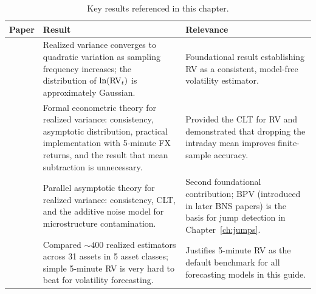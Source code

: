 
\begin{table}[htbp]
\centering
\caption{Key results referenced in this chapter.}
\label{tab:ch02-key-results}
\begin{tabular}{@{} p{4.5cm} p{6cm} p{4cm} @{}}
\toprule
\textbf{Paper} & \textbf{Result} & \textbf{Relevance} \\
\midrule
\citet{ABDL2001} &
Realized variance converges to quadratic variation as sampling frequency increases; the distribution of $\ln(\operatorname{RV}_t)$ is approximately Gaussian. &
Foundational result establishing RV as a consistent, model-free volatility estimator. \\[6pt]

\citet{ABDL2003} &
Formal econometric theory for realized variance: consistency, asymptotic distribution, practical implementation with 5-minute FX returns, and the result that mean subtraction is unnecessary. &
Provided the CLT for RV and demonstrated that dropping the intraday mean improves finite-sample accuracy. \\[6pt]

\citet{BNS2002} &
Parallel asymptotic theory for realized variance: consistency, CLT, and the additive noise model for microstructure contamination. &
Second foundational contribution; BPV (introduced in later BNS papers) is the basis for jump detection in Chapter~\ref{ch:jumps}. \\[6pt]

\citet{LPS2015} &
Compared ${\sim}400$ realized estimators across 31 assets in 5 asset classes; simple 5-minute RV is very hard to beat for volatility forecasting. &
Justifies 5-minute RV as the default benchmark for all forecasting models in this guide. \\
\bottomrule
\end{tabular}
\end{table}
